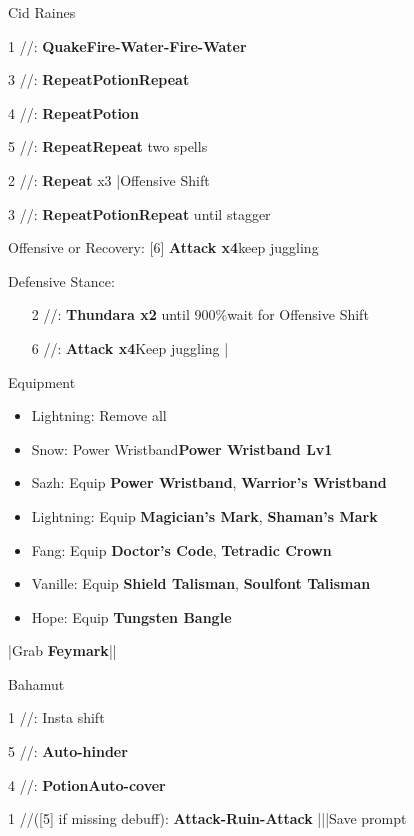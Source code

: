 \begin{fight}{Cid Raines}
	\item [1] \rav/\sen/\syn: \textbf{Quake}\to \textbf{Fire-Water-Fire-Water}
	\item [3] \rav/\sen/\rav: \textbf{Repeat}\to \textbf{Potion}\to \textbf{Repeat}
	\item [4] \rav/\sen/\rav: \textbf{Repeat}\to \textbf{Potion}
	\item [5] \rav/\rav/\syn: \textbf{Repeat}\to \textbf{Repeat} two spells
	\item [2] \rav/\rav/\rav: \textbf{Repeat} x3 |Offensive Shift
	\item [3] \rav/\sen/\rav: \textbf{Repeat}\to \textbf{Potion}\to \textbf{Repeat} until stagger
	\item Offensive or Recovery: [6] \textbf{Attack x4}\to keep juggling
	\item Defensive Stance:
	\begin{itemize}
		\item [2] \rav/\rav/\rav: \textbf{Thundara x2} until 900\%\to wait for Offensive Shift
		\item [6] \com/\com/\rav: \textbf{Attack x4}\to Keep juggling |\skip
	\end{itemize}
\end{fight}
\begin{menu}
	\item Equipment
	\begin{itemize}
		\item Lightning: Remove all
		\item Snow: Power Wristband\star \to \textbf{Power Wristband Lv1}
		\item Sazh: Equip \textbf{Power Wristband\star}, \textbf{Warrior's Wristband}
		\item Lightning: Equip \textbf{Magician's Mark}, \textbf{Shaman's Mark}
		\item Fang: Equip \textbf{Doctor's Code}, \textbf{Tetradic Crown}
		\item Vanille: Equip \textbf{Shield Talisman}, \textbf{Soulfont Talisman}
		\item Hope: Equip \textbf{Tungsten Bangle}
	\end{itemize}
\end{menu}
\begin{mainlist}
	\item \skip|Grab \textbf{Feymark}|\skip|
\end{mainlist}
\begin{fight}{Bahamut}
	\item [1] \com/\rav/\rav: Insta shift
	\item [5] \sab/\com/\rav: \textbf{Auto-hinder}
	\item [4] \sen/\med/\med: \textbf{Potion}\to \textbf{Auto-cover}
	\item [1] \com/\rav/\rav ([5] if missing debuff): \textbf{Attack-Ruin-Attack} |\skip||Save prompt
\end{fight}
